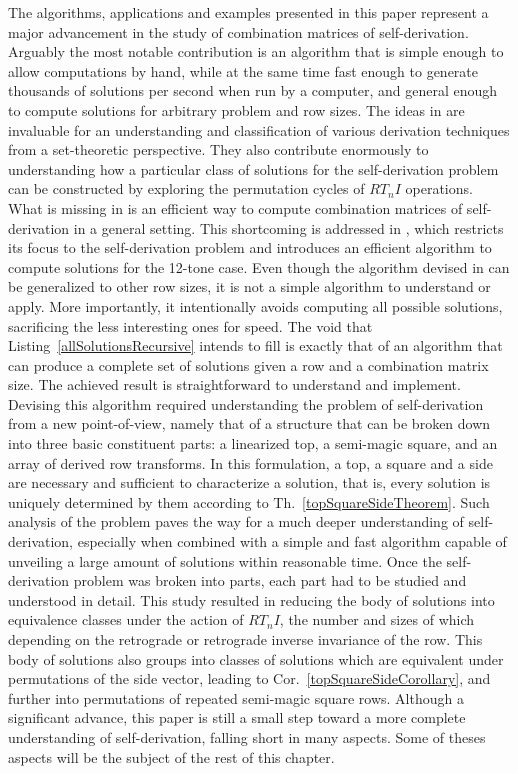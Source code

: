 The algorithms, applications and examples presented in this paper represent a major advancement in the study of combination matrices of self-derivation. Arguably the most notable contribution is an algorithm that is simple enough to allow computations by hand, while at the same time fast enough to generate thousands of solutions per second when run by a computer, and general enough to compute solutions for arbitrary problem and row sizes. The ideas in \cite{Starr1984} are invaluable for an understanding and classification of various derivation techniques from a set-theoretic perspective. They also contribute enormously to understanding how a particular class of solutions for the self-derivation problem can be constructed by exploring the permutation cycles of $RT_nI$ operations. What is missing in \cite{Starr1984} is an efficient way to compute combination matrices of self-derivation in a general setting. This shortcoming is addressed in \cite{Kowalski1987b}, which restricts its focus to the self-derivation problem and introduces an efficient algorithm to compute solutions for the 12-tone case. Even though the algorithm devised in \cite{Kowalski1987b} can be generalized to other row sizes, it is not a simple algorithm to understand or apply. More importantly, it intentionally avoids computing all possible solutions, sacrificing the less interesting ones for speed. The void that Listing~\ref{allSolutionsRecursive} intends to fill is exactly that of an algorithm that can produce a complete set of solutions given a row and a combination matrix size. The achieved result is straightforward to understand and implement. Devising this algorithm required understanding the problem of self-derivation from a new point-of-view, namely that of a structure that can be broken down into three basic constituent parts: a linearized top, a semi-magic square, and an array of derived row transforms. In this formulation, a top, a square and a side are necessary and sufficient to characterize a solution, that is, every solution is uniquely determined by them according to Th.~\ref{topSquareSideTheorem}. Such analysis of the problem paves the way for a much deeper understanding of self-derivation, especially when combined with a simple and fast algorithm capable of unveiling a large amount of solutions within reasonable time. Once the self-derivation problem was broken into parts, each part had to be studied and understood in detail. This study resulted in reducing the body of solutions into equivalence classes under the action of $RT_nI$, the number and sizes of which depending on the retrograde or retrograde inverse invariance of the row. This body of solutions also groups into classes of solutions which are equivalent under permutations of the side vector, leading to Cor.~\ref{topSquareSideCorollary}, and further into permutations of repeated semi-magic square rows. Although a significant advance, this paper is still a small step toward a more complete understanding of self-derivation, falling short in many aspects. Some of theses aspects will be the subject of the rest of this chapter.

